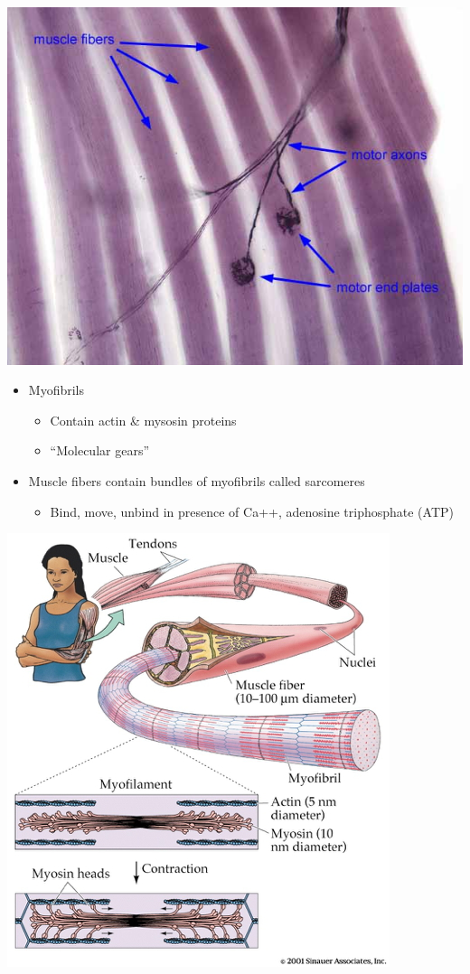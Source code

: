 \documentclass[
  letterpaper,
  DIV=11,
  numbers=noendperiod]{scrartcl}
\providecommand{\tightlist}{%
  \setlength{\itemsep}{0pt}\setlength{\parskip}{0pt}}\usepackage{longtable,booktabs,array}
\begin{document}
\includegraphics{action_files/mediabag/NM040b.jpg}

\begin{itemize}
\tightlist
\item
  Myofibrils

  \begin{itemize}
  \tightlist
  \item
    Contain actin \& mysosin proteins
  \item
    ``Molecular gears''
  \end{itemize}
\item
  Muscle fibers contain bundles of myofibrils called sarcomeres

  \begin{itemize}
  \tightlist
  \item
    Bind, move, unbind in presence of Ca++, adenosine triphosphate (ATP)
  \end{itemize}
\end{itemize}

\begin{center}
\includegraphics{../include/img/muscle-fibers-biopsych.jpg}
\end{center}
\end{document}
